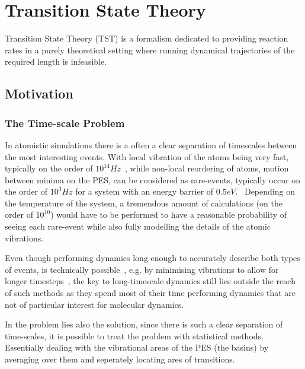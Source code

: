\section{Transition State Theory}
\label{sec:tst}

Transition State Theory (TST) is a formalism dedicated to providing reaction rates in a purely theoretical setting where running dynamical trajectories of the required length is infeasible.

\incomplete

\subsection{Motivation}

\subsubsection{The Time-scale Problem}


In atomistic simulations there is a often a clear separation of timescales between the most interesting events.
With local vibration of the atoms being very fast, typically on the order of $10^14 \unit{Hz}$~\citemiss,
while non-local reordering of atoms, motion between minima on the PES, can be considered as rare-events, typically occur on the order of $10^3 \unit{Hz}$ for a system with an energy barrier of $0.5 \unit{eV}$.~\citemiss
Depending on the temperature of the system, a tremendous amount of calculations (on the order of $10^10$) would have to be performed to have a reasonable probability of seeing each rare-event while also fully modelling the details of the atomic vibrations.

Even though performing dynamics long enough to accurately describe both types of events, is technically possible~\citemiss, e.g. by minimising vibrations to allow for longer timesteps~\citemiss, the key to long-timescale dynamics still lies outside the reach of such methods as they spend most of their time performing dynamics that are not of particular interest for molecular dynamics.

In the problem lies also the solution, since there is such a clear separation of time-scales, it is possible to treat the problem with statistical methods.
Essentially dealing with the vibrational areas of the PES (the basins) by averaging over them and seperately locating ares of transitions.

